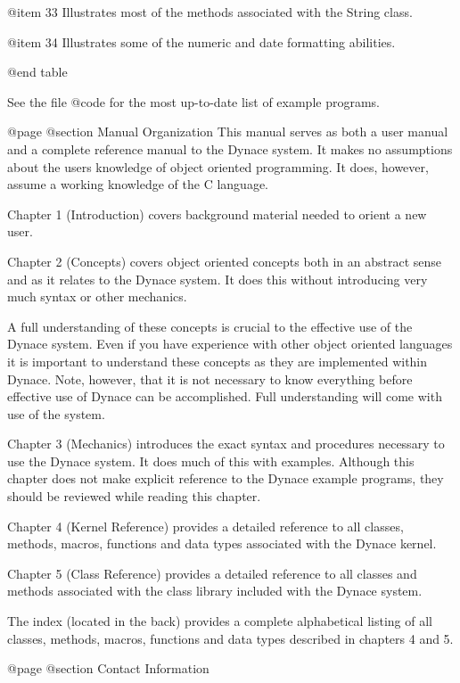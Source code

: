 @item 33
Illustrates most of the methods associated with the String class.

@item 34
Illustrates some of the numeric and date formatting abilities.

@end table


See the file @code{\DYNACE\EXAMPLES\LIST} for the most up-to-date list
of example programs.


@page
@section Manual Organization
This manual serves as both a user manual and a complete reference manual
to the Dynace system.  It makes no assumptions about the users knowledge
of object oriented programming.  It does, however, assume a working
knowledge of the C language.

Chapter 1 (Introduction) covers background material needed to orient
a new user.

Chapter 2 (Concepts) covers object oriented concepts both in an abstract
sense and as it relates to the Dynace system.  It does this without
introducing very much syntax or other mechanics.

A full understanding of these concepts is crucial to the effective use
of the Dynace system.  Even if you have experience with other object
oriented languages it is important to understand these concepts as they
are implemented within Dynace.  Note, however, that it is not necessary to
know everything before effective use of Dynace can be accomplished.  Full
understanding will come with use of the system.

Chapter 3 (Mechanics) introduces the exact syntax and procedures
necessary to use the Dynace system.  It does much of this with examples.
Although this chapter does not make explicit reference to the Dynace example
programs, they should be reviewed while reading this chapter.

Chapter 4 (Kernel Reference) provides a detailed reference to all
classes, methods, macros, functions and data types associated with
the Dynace kernel.

Chapter 5 (Class Reference)  provides a detailed reference to all
classes and methods associated with the class library included
with the Dynace system.

The index (located in the back) provides a complete alphabetical
listing of all classes, methods, macros, functions and data types
described in chapters 4 and 5.






@page
@section Contact Information

